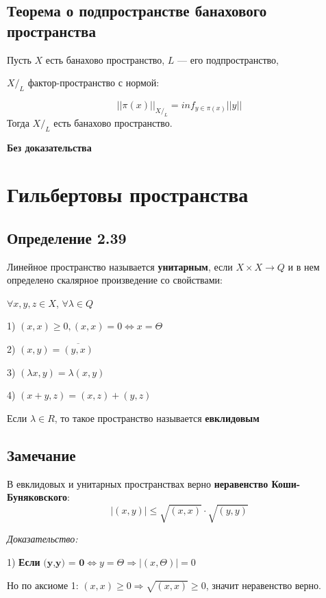 \documentclass[12pt]{article}
\begin{document}
	
\subsection{Теорема о подпространстве банахового пространства}

	Пусть $X$ есть банахово пространство, $L$ — его подпространство, 
	
	${X\text{/}_L}$  фактор-пространство 	с нормой:
	

		$$||\pi(x)||_{X\text{/}_L} = inf_{y \in \pi(x)} ||y|| $$
Тогда $X\text{/}_L$ есть банахово пространство.
	
		
	\textbf{Без доказательства}
	
\newpage
\section{Гильбертовы пространства}

\subsection*{Определение 2.39}
	Линейное пространство называется \textbf{унитарным},
	 если $X \times X \to Q$ и в нем определено скалярное произведение со свойствами:
	
	$\forall x,y,z \in X$, $\forall \lambda \in Q$	
	
	1) $(x, x) \ge 0, (x, x) = 0 \Leftrightarrow x = \Theta$
	
	2) $(x, y) = \overline{(y, x)}$
	
	3) $(\lambda x, y) = \lambda (x, y)$
	
	4) $(x + y, z) = (x, z)+(y, z)$

	Если $\lambda \in R$, то такое пространство называется \textbf{евклидовым}
	
	
	
\subsection*{Замечание}

	В евклидовых и унитарных пространствах верно \textbf{неравенство Коши-Буняковского}:
	$$|(x,y)| \leq \sqrt{(x,x)} \cdot \sqrt{(y,y)} $$
	
\textit{Доказательство:}
		


1)	\textbf{Если} $\textbf{(y,y) = 0} \Leftrightarrow y = \Theta \Rightarrow |(x,\Theta)| = 0$	
		
		Но по аксиоме 1: $(x,x) \ge 0 \Rightarrow \sqrt{(x,x)} \ge 0$, значит неравенство верно.
		
\end{document}
